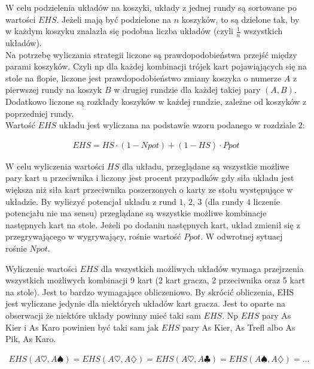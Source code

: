 \documentclass[licencjacka]{pracamgr}
\begin{document}
\noindent
W celu podzielenia układów na koszyki, układy z jednej rundy są sortowane po wartości $EHS$. Jeżeli mają być podzielone na
$n$ koszyków, to są dzielone tak, by w każdym koszyku znalazła się podobna liczba układów (czyli $\frac{1}{n}$ wszystkich układów). \\

\noindent
Na potrzebę wyliczania strategii liczone są prawdopodobieństwa przejść między parami koszyków. Czyli np dla każdej kombinacji
trójek kart pojawiąjących się na stole na flopie, liczone jest prawdopodobieństwo zmiany koszyka o numerze $A$ z pierwszej
rundy na koszyk $B$ w drugiej rundzie dla każdej takiej pary $(A, B)$. Dodatkowo liczone są rozkłady koszyków
w każdej rundzie, zależne od koszyków z poprzedniej rundy. \\

\noindent
Wartość $EHS$ układu jest wyliczana na podstawie wzoru podanego w rozdziale 2:

\begin{align*}
EHS = HS \cdot (1 - Npot) + (1 - HS) \cdot Ppot
\end{align*}

\noindent
W celu wyliczenia wartości $HS$ dla układu, przeglądane są wszystkie możliwe pary kart u przeciwnika i liczony jest procent
przypadków gdy siła układu jest większa niż siła kart przeciwnika poszerzonych o karty ze stołu występujące w układzie.
By wyliczyć potencjał układu z rund $1$, $2$, $3$ (dla rundy $4$ liczenie potencjału nie ma sensu) przeglądane są wszystkie
możliwe kombinacje następnych kart na stole. Jeżeli po dodaniu następnych kart, układ zmienił się z przegrywającego w
wygrywający, rośnie wartość $Ppot$. W odwrotnej sytuacj rośnie $Npot$.

\noindent
Wyliczenie wartości $EHS$ dla wszystkich możliwych układów wymaga przejrzenia wszystkich możliwych kombinacji 9 kart (2 kart gracza, 2 przeciwnika
oraz 5 kart na stole). Jest to bardzo wymagające obliczeniowo. By skrócić obliczenia, EHS jest wyliczane jedynie dla niektórych układów
kart gracza. Jest to oparte na obserwacji że niektóre układy powinny mieć taki sam $EHS$. Np $EHS$ pary As Kier i As Karo powinien być taki
sam jak $EHS$ pary As Kier, As Trefl albo As Pik, As Karo. 

\begin{align*}
EHS(A\heartsuit, A\spadesuit) = EHS(A\heartsuit, A\diamondsuit) = EHS(A\heartsuit, A\clubsuit) = EHS(A\spadesuit, A\diamondsuit) = ...
\end{align*}
\end{document}
